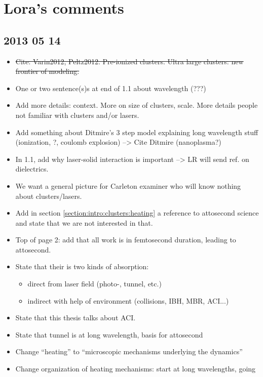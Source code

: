 \section*{Lora's comments}

\subsection*{2013 05 14}

\begin{itemize}
\item \sout{Cite: Varin2012, Peltz2012. Pre-ionized
clusters. Ultra large clusters: new frontier of modeling.}
\item One or two sentence(s)s at end of 1.1 about wavelength (???)
\item Add more details: context. More on size of clusters, scale. More details
people not familiar with clusters and/or lasers.
\item Add something about Ditmire's 3 step model explaining long wavelength stuff
(ionization, ?, coulomb explosion) --> Cite Ditmire (nanoplasma?)
\item In 1.1, add why laser-solid interaction is important --> LR will send ref.
on dielectrics.
\item We want a general picture for Carleton examiner who will know nothing about
clusters/lasers.
\item Add in section \ref{section:intro:clusters:heating} a reference to
attosecond science and state that we are not interested in that.
\item Top of page 2: add that all work is in femtosecond duration, leading to
attosecond.
\item State that their is two kinds of absorption:
    \begin{itemize}
    \item direct from laser field (photo-, tunnel, etc.)
    \item indirect with help of environment (collisions, IBH, MBR, ACI...)
    \end{itemize}
\item State that this thesis talks about ACI.
\item State that tunnel is at long wavelength, basis for attosecond
\item Change ``heating'' to ``microscopic mechanisms underlying the dynamics''
\item Change organization of heating mechanisms: start at long wavelengths, going

\end{itemize}
